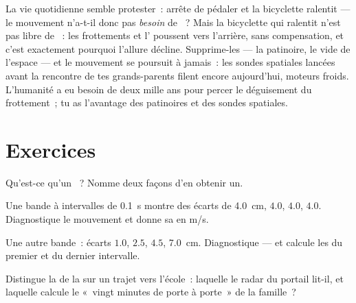 \begin{remark}\label{rem:g9:uniform-varied-motion:surprise}
La vie quotidienne semble protester~: arrête de pédaler et la
bicyclette ralentit --- le mouvement n'a-t-il donc pas \emph{besoin}
de ~? Mais la bicyclette qui ralentit n'est pas libre de ~:
les frottements et l' poussent vers l'arrière, sans compensation,
et c'est exactement pourquoi l'allure décline. Supprime-les --- la
patinoire, le vide de l'espace --- et le mouvement se poursuit à
jamais~: les sondes spatiales lancées avant la rencontre de tes
grands-parents filent encore aujourd'hui, moteurs froids. L'humanité a
eu besoin de deux mille ans pour percer le déguisement du frottement~;
tu as l'avantage des patinoires et des sondes spatiales.
\end{remark}

\section{Exercices}

\begin{exercise}[$\star$]\label{exo:g9:uniform-varied-motion:1}
Qu'est-ce qu'un ~? Nomme deux
façons d'en obtenir un.
\end{exercise}

\begin{exercise}[$\star$]\label{exo:g9:uniform-varied-motion:2}
Une bande à intervalles de \qty{0.1}{s} montre des écarts de
\qty{4.0}{cm}, $4.0$, $4.0$, $4.0$. Diagnostique le mouvement et
donne sa  en \unit{m/s}.
\end{exercise}

\begin{exercise}[$\star$]\label{exo:g9:uniform-varied-motion:3}
Une autre bande~: écarts $1.0$, $2.5$, $4.5$, \qty{7.0}{cm}.
Diagnostique --- et calcule les  du premier et du dernier
intervalle.
\end{exercise}

\begin{exercise}[$\star$]\label{exo:g9:uniform-varied-motion:4}
Distingue la  de la  sur un trajet
vers l'école~: laquelle le radar du portail lit-il, et laquelle
calcule le «~vingt minutes de porte à porte~» de la famille~?
\end{exercise}

